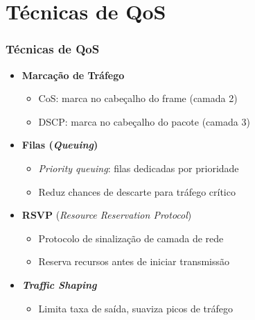 \documentclass{beamer}
\begin{document}
  \section{Técnicas de QoS}

  \begin{frame}
    \frametitle{Técnicas de QoS}
    \begin{itemize}
      \item<1-> \textbf{Marcação de Tráfego}
        \begin{itemize}
          \item CoS: marca no cabeçalho do frame (camada 2)
          \item DSCP: marca no cabeçalho do pacote (camada 3)
        \end{itemize}
      \item<2-> \textbf{Filas (\textit{Queuing})}
        \begin{itemize}
          \item \textit{Priority queuing}: filas dedicadas por prioridade
          \item Reduz chances de descarte para tráfego crítico
        \end{itemize}
      \item<3-> \textbf{RSVP} (\textit{Resource Reservation Protocol})
        \begin{itemize}
          \item Protocolo de sinalização de camada de rede
          \item Reserva recursos antes de iniciar transmissão
        \end{itemize}
      \item<4-> \textbf{\textit{Traffic Shaping}}
        \begin{itemize}
          \item Limita taxa de saída, suaviza picos de tráfego
        \end{itemize}
    \end{itemize}
  \end{frame}
\end{document}
